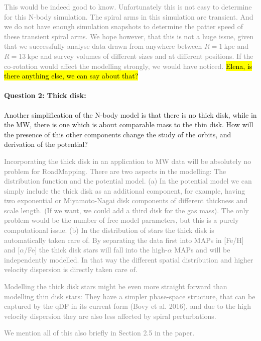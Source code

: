 \documentclass[10pt,a4paper]{article}
\newcommand{\Answer}[1]{\textcolor{Gray}{#1}}
\begin{document}
\Answer{This would be indeed good to know. Unfortunately this is not easy to determine for this N-body simulation. The spiral arms in this simulation are transient. And we do not have enough simulation snapshots to determine the patter speed of these transient spiral arms. We hope however, that this is not a huge issue, given that we successfully analyse data drawn from anywhere between $R=1~\text{kpc}$ and $R=13~\text{kpc}$ and survey volumes of different sizes and at different positions. If the co-rotation would affect the modelling strongly, we would have noticed.} \hl{Elena, is there anything else, we can say about that?}

\paragraph{Question 2: Thick disk:} Another simplification of the N-body model is that there is no thick disk, while in
the MW, there is one which is about comparable mass to the thin disk. How will the
presence of this other components change the study of the orbits, and derivation of
the potential?

\Answer{Incorporating the thick disk in an application to MW data will be absolutely no problem for RoadMapping. There are two aspects in the modelling: The distribution function and the potential model. (a) In the potential model we can simply include the thick disk as an additional component, for example, having two exponential or Miyamoto-Nagai disk components of different thickness and scale length. (If we want, we could add a third disk for the gas mass). The only problem would be the number of free model parameters, but this is a purely computational issue. (b) In the distribution of stars the thick disk is automatically taken care of. By separating the data first into MAPs in [Fe/H] and [$\alpha$/Fe] the thick disk stars will fall into the high-$\alpha$ MAPs and will be independently modelled. In that way the different spatial distribution and higher velocity dispersion is directly taken care of.}

\Answer{Modelling the thick disk stars might be even more straight forward than modelling thin disk stars: They have a simpler phase-space structure, that can be captured by the qDF in its current form (Bovy et al. 2016), and due to the high velocity dispersion they are also less affected by spiral perturbations.}

\Answer{We mention all of this also briefly in Section 2.5 in the paper.}
\end{document}
